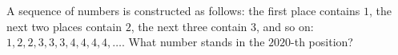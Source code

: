 A sequence of numbers is constructed as follows: the first place contains $1$, the next two places contain $2$, the next three contain $3$, and so on: $1, 2, 2, 3, 3, 3, 4, 4, 4, 4, \ldots$. What number stands in the $2020$-th position?

